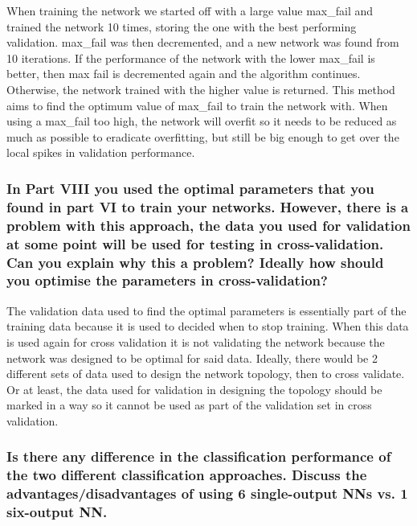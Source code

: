 \documentclass[12pt]{article}
\begin{document}
When training the network we started off with a large value max\_fail and trained the network 10 times, storing the one with the best performing validation. max\_fail was then decremented, and a new network was found from 10 iterations. If the performance of the network with the lower max\_fail is better, then max fail is decremented again and the algorithm continues. Otherwise, the network trained with the higher value is returned. This method aims to find the optimum value of max\_fail to train the network with. When using a max\_fail too high, the network will overfit so it needs to be reduced as much as possible to eradicate overfitting, but still be big enough to get over the local spikes in validation performance. 


\subsubsection*{In Part VIII you used the optimal parameters that you found in part VI to train your networks. However, there is a problem with this approach, the data you used for validation at some point will be used for testing in cross-validation. Can you explain why this a problem? Ideally how should you optimise the parameters in cross-validation?}

The validation data used to find the optimal parameters is essentially part of the training data because it is used to decided when to stop training. When this data is used again for cross validation it is not validating the network because the network was designed to be optimal for said data. Ideally, there would be 2 different sets of data used to design the network topology, then to cross validate. Or at least, the data used for validation in designing the topology should be marked in a way so it cannot be used as part of the validation set in cross validation.

\subsubsection*{Is there any difference in the classification performance of the two different classification approaches. Discuss the advantages/disadvantages of using 6 single-output NNs vs. 1 six-output NN.}
\end{document}
